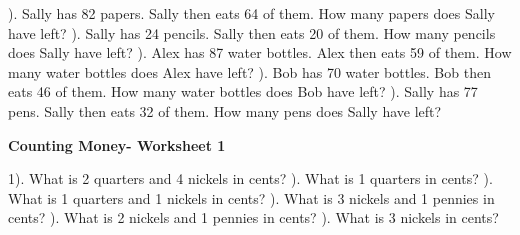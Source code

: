 \documentclass{article}%
\begin{document}
). Sally has 82 papers. Sally then eats 64 of them. How many papers does Sally have left?%
\newline%
\newline%
). Sally has 24 pencils. Sally then eats 20 of them. How many pencils does Sally have left?%
\newline%
\newline%
). Alex has 87 water bottles. Alex then eats 59 of them. How many water bottles does Alex have left?%
\newline%
\newline%
). Bob has 70 water bottles. Bob then eats 46 of them. How many water bottles does Bob have left?%
\newline%
\newline%
). Sally has 77 pens. Sally then eats 32 of them. How many pens does Sally have left?%
\newline%
\newline%
\newline%
\pagebreak%
\large%
\begin{center}%
\textbf{Counting Money- Worksheet 1}%
\newline%
\end{center} \normalsize%
1). What is 2 quarters and 4 nickels in cents?%
\newline%
\newline%
). What is 1 quarters in cents?%
\newline%
\newline%
). What is 1 quarters and 1 nickels in cents?%
\newline%
\newline%
). What is 3 nickels and 1 pennies in cents?%
\newline%
\newline%
). What is 2 nickels and 1 pennies in cents?%
\newline%
\newline%
). What is 3 nickels in cents?%
\newline%
\newline%
\end{document}
